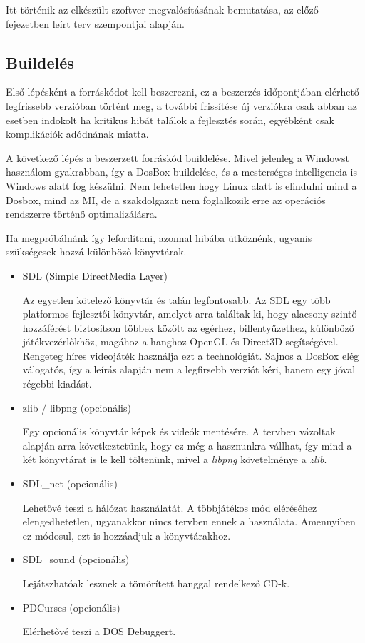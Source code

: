 
Itt történik az elkészült szoftver megvalósításának bemutatása, az előző fejezetben leírt terv szempontjai alapján.


\subsection{Buildelés}
Első lépésként a forráskódot kell beszerezni, ez a beszerzés időpontjában elérhető legfrissebb verzióban történt meg, a további frissítése új verziókra csak abban az esetben indokolt ha kritikus hibát találok a fejlesztés során, egyébként csak komplikációk adódnának miatta.

A következő lépés a beszerzett forráskód buildelése. Mivel jelenleg a Windowst használom gyakrabban, így a DosBox buildelése, és a mesterséges intelligencia is Windows alatt fog készülni. Nem lehetetlen hogy Linux alatt is elindulni mind a Dosbox, mind az MI, de a szakdolgazat nem foglalkozik erre az operációs rendszerre történő optimalizálásra.

Ha megpróbálnánk így lefordítani, azonnal hibába ütköznénk, ugyanis szükségesek hozzá különböző könyvtárak.

\begin{itemize}

    \item SDL (Simple DirectMedia Layer)
    
    Az egyetlen kötelező könyvtár és talán legfontosabb. Az SDL egy több platformos fejlesztői könyvtár, amelyet arra találtak ki, hogy alacsony szintő hozzáférést biztosítson többek között az egérhez, billentyűzethez, különböző játékvezérlőkhöz, magához a hanghoz OpenGL és Direct3D segítségével. Rengeteg híres videojáték használja ezt a technológiát. Sajnos a DosBox elég válogatós, így a leírás alapján nem a legfirsebb verziót kéri, hanem egy jóval régebbi kiadást.
    \item zlib / libpng (opcionális)
    
    Egy opcionális könyvtár képek és videók mentésére. A tervben vázoltak alapján arra következtetünk, hogy ez még a hasznunkra vállhat, így mind a két könyvtárat is le kell töltenünk, mivel a \textit{libpng} követelménye a \textit{zlib}. 
    \item SDL\_net (opcionális)
    
    Lehetővé teszi a hálózat használatát. A többjátékos mód eléréséhez elengedhetetlen, ugyanakkor nincs tervben ennek a használata. Amennyiben ez módosul, ezt is hozzáadjuk a könyvtárakhoz.
    \item SDL\_sound (opcionális)
    
    Lejátszhatóak lesznek a tömörített hanggal rendelkező CD-k.
    \item PDCurses (opcionális)
    
    Elérhetővé teszi a DOS Debuggert.

\end{itemize}

